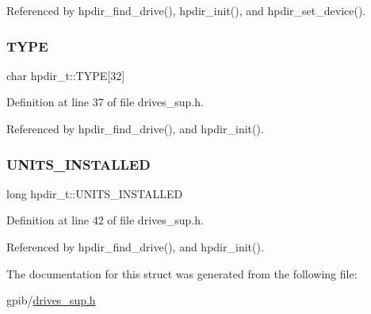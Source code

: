 Referenced by hpdir\+\_\+find\+\_\+drive(), hpdir\+\_\+init(), and hpdir\+\_\+set\+\_\+device().

\mbox{\label{structhpdir__t_ad2f925b088d4fd746c9ea789f34f9507}} 
\subsubsection{\texorpdfstring{T\+Y\+PE}{TYPE}}
{\footnotesize\ttfamily char hpdir\+\_\+t\+::\+T\+Y\+PE\mbox{[}32\mbox{]}}



Definition at line 37 of file drives\+\_\+sup.\+h.



Referenced by hpdir\+\_\+find\+\_\+drive(), and hpdir\+\_\+init().

\mbox{\label{structhpdir__t_a748150d5e0351e2d827f2a4def385ca9}} 
\subsubsection{\texorpdfstring{U\+N\+I\+T\+S\+\_\+\+I\+N\+S\+T\+A\+L\+L\+ED}{UNITS\_INSTALLED}}
{\footnotesize\ttfamily long hpdir\+\_\+t\+::\+U\+N\+I\+T\+S\+\_\+\+I\+N\+S\+T\+A\+L\+L\+ED}



Definition at line 42 of file drives\+\_\+sup.\+h.



Referenced by hpdir\+\_\+find\+\_\+drive(), and hpdir\+\_\+init().



The documentation for this struct was generated from the following file\+:\begin{DoxyCompactItemize}
\item 
gpib/\hyperlink{drives__sup_8h}{drives\+\_\+sup.\+h}\end{DoxyCompactItemize}
